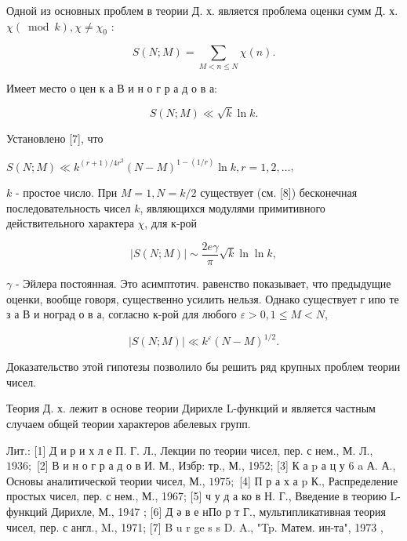 \documentclass[10pt]{article}
\begin{document}
Одной из основных проблем в теории Д. х. является проблема оценки сумм Д. х. $\chi(\bmod k), \chi \neq \chi_{0}$ :



\[

S(N ; M)=\sum_{M<n \leqslant N} \chi(n) .

\]



Имеет место о цен к а В и н о г р а д о в а:



\[

S(N ; M) \ll \sqrt{k} \ln k .

\]



Установлено [7], что



$S(N ; M) \ll k^{(r+1) / 4 r^{2}}(N-M)^{1-(1 / r)} \ln k, r=1,2, \ldots$,



$k$ - простое число. При $M=1, N=k / 2$ существует (см. [8]) бесконечная последовательность чисел $k$, являющихся модулями примитивного действительного характера $\chi$, для к-рой



\[

|S(N ; M)| \sim \frac{2 e \gamma}{\pi} \sqrt{k} \ln \ln k,

\]



$\gamma$ - Эйлера постоянная. Это асимптотич. равенство показывает, что предыдущие оценки, вообще говоря, существенно усилить нельзя. Однако существует г ипо те з а В и ноград о в а, согласно к-рой для любого $\varepsilon>0,1 \leqslant M<N$,



\[

|S(N ; M)| \ll k^{\varepsilon}(N-M)^{1 / 2} .

\]



Доказательство этой гипотезы позволило бы решить ряд крупных проблем теории чисел.



Теория Д. х. лежит в основе теории Дирихле L-функций и является частным случаем общей теории характеров абелевых групп.



Лит.: [1] Д и р и х л е П. Г. Л., Лекции по теории чисел, пер. с нем., М. Л., $1936 ;$ [2] В и н о г р а д о в И. М., Избр: тр., М., 1952; [3] К а p а ц у 6 a А. А., Основы аналитической теории чисел, М., $1975 ;$ [4] П р а х а p К., Распределение простых чисел, пер. с нем., М., 1967; [5] ч у д а ко в Н. Г., Введение в теорию L-функций Дирихле, М., 1947 ; [6] Д ә в е нПо р т Г., мультипликативная теория чисел, пер. с англ., M., 1971; [7] B u r ge s s D. A., "Tp. Матем. ин-та", 1973 ,
\end{document}
